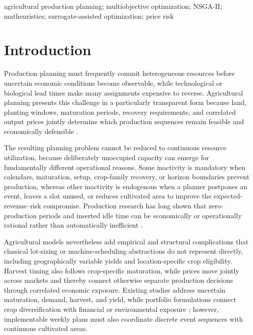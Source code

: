 \documentclass[]{interact}
\begin{document}
\begin{keywords}
agricultural production planning; multiobjective optimization; NSGA-II; matheuristics; surrogate-assisted optimization; price risk
\end{keywords}

\section{Introduction}

Production planning must frequently commit heterogeneous resources before uncertain economic conditions become observable, while technological or biological lead times make many assignments expensive to reverse. Agricultural planning presents this challenge in a particularly transparent form because land, planting windows, maturation periods, recovery requirements, and correlated output prices jointly determine which production sequences remain feasible and economically defensible \citep{Ahumada2009,Tan2012}.

The resulting planning problem cannot be reduced to continuous resource utilization, because deliberately unoccupied capacity can emerge for fundamentally different operational reasons. Some inactivity is mandatory when calendars, maturation, setup, crop-family recovery, or horizon boundaries prevent production, whereas other inactivity is endogenous when a planner postpones an event, leaves a slot unused, or reduces cultivated area to improve the expected-revenue--risk compromise. Production research has long shown that zero-production periods and inserted idle time can be economically or operationally rational rather than automatically inefficient \citep{WagnerWhitin1958,KanetSridharan2000,Jodlbauer2006,TrevinoMartinez2022}.

Agricultural models nevertheless add empirical and structural complications that classical lot-sizing or machine-scheduling abstractions do not represent directly, including geographically variable yields and location-specific crop eligibility. Harvest timing also follows crop-specific maturation, while prices move jointly across markets and thereby connect otherwise separate production decisions through correlated economic exposure. Existing studies address uncertain maturation, demand, harvest, and yield, while portfolio formulations connect crop diversification with financial or environmental exposure \citep{Tan2012,Radulescu2014,Burbano2022}; however, implementable weekly plans must also coordinate discrete event sequences with continuous cultivated areas.
\end{document}
